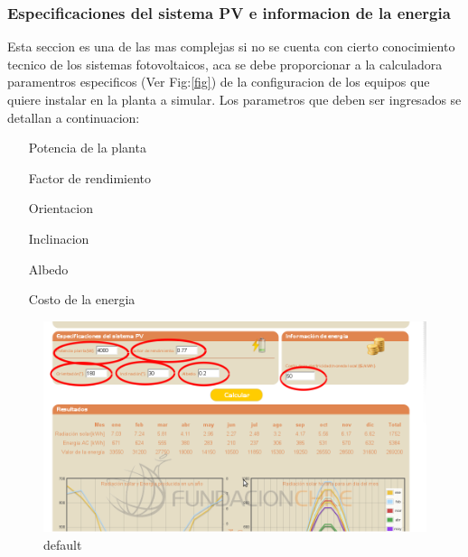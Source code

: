 \subsubsection{Especificaciones del sistema PV e informacion de la energia}
Esta seccion es una de las mas complejas si no se cuenta con cierto conocimiento tecnico de los sistemas fotovoltaicos, aca se debe proporcionar a la calculadora paramentros especificos (Ver Fig:\ref{fig}) de la configuracion de los equipos que quiere instalar en la planta a simular. Los parametros que deben ser ingresados se detallan a continuacion:\\
\begin{itemize}
\item[Potencia de la planta]
\item[Factor de rendimiento]
\item[Orientacion]
\item[Inclinacion]
\item[Albedo]
\item[Costo de la energia]
\end{itemize}

\begin{figure}[ht]
        \centering
        \includegraphics[width=\textwidth]{./images/cap5chap1img8}
        \caption{default}
        \label{fig:figure1}
\end{figure}

